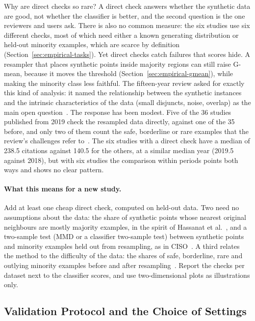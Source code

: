 Why are direct checks so rare? A direct check answers whether the synthetic data are good, not whether the classifier is better, and the second question is the one reviewers and users ask. There is also no common measure: the six studies use six different checks, most of which need either a known generating distribution or held-out minority examples, which are scarce by definition (Section~\ref{sec:empirical-tasks}). Yet direct checks catch failures that scores hide. A resampler that places synthetic points inside majority regions can still raise G-mean, because it moves the threshold (Section~\ref{sec:empirical-gmean}), while making the minority class less faithful. The fifteen-year review asked for exactly this kind of analysis: it named the relationship between the synthetic instances and the intrinsic characteristics of the data (small disjuncts, noise, overlap) as the main open question~\parencite{fernandez2018smote}. The response has been modest. Five of the 36 studies published from 2019 check the resampled data directly, against one of the 35 before, and only two of them count the safe, borderline or rare examples that the review's challenges refer to~\parencite{liu2020spe,han2023glos}. The six studies with a direct check have a median of 238.5 citations against 140.5 for the others, at a similar median year (2019.5 against 2018), but with six studies the comparison within periods points both ways and shows no clear pattern.

\paragraph{What this means for a new study.} Add at least one cheap direct check, computed on held-out data. Two need no assumptions about the data: the share of synthetic points whose nearest original neighbours are mostly majority examples, in the spirit of Hassanat et al.~\parencite{hassanat2022stop}, and a two-sample test (MMD or a classifier two-sample test) between synthetic points and minority examples held out from resampling, as in CISO~\parencite{yadav2025ciso}. A third relates the method to the difficulty of the data: the shares of safe, borderline, rare and outlying minority examples before and after resampling~\parencite{napierala2016types}. Report the checks per dataset next to the classifier scores, and use two-dimensional plots as illustrations only.

\subsection{Validation Protocol and the Choice of Settings}
\label{sec:empirical-protocol}

